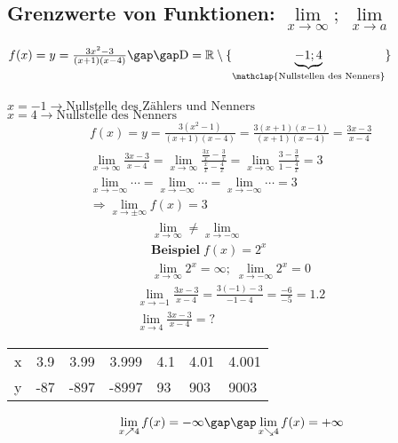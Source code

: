 \subsection{Grenzwerte von Funktionen: $\lim\limits_{x \to \infty};\; \lim\limits_{x \to a}$}
$f(x) = y = \frac{3x^2 - 3}{(x + 1)(x - 4)} \gap\gap \text{D} = \mathbb{R}\setminus\{\underbrace{-1; 4}_{\mathclap{\text{Nullstellen des Nenners}}}\}$ \\\\
$x = -1 \rightarrow \text{Nullstelle des Zählers und Nenners}$ \\
$x = 4 \rightarrow \text{Nullstelle des Nenners}$
\begin{gather*}
  f(x) = y = \frac{3(x^2 - 1)}{(x + 1)(x - 4)} = \frac{3(x + 1)(x - 1)}{(x + 1)(x - 4)} = \frac{3x - 3}{x - 4} \\
  \lim\limits_{x \to \infty} \frac{3x - 3}{x - 4} = \lim\limits_{x \to \infty} \frac{\frac{3x}{x} - \frac{3}{x}}{\frac{x}{x} - \frac{4}{x}} = \lim\limits_{x \to \infty} \frac{3 - \frac{3}{x}}{1 - \frac{4}{x}} = 3 \\
  \lim\limits_{x \to -\infty} \cdots = \lim\limits_{x \to -\infty} \cdots = \lim\limits_{x \to -\infty} \cdots = 3 \\
  \Rightarrow \lim\limits_{x \to \pm\infty} f(x) = 3
\end{gather*}
\begin{gather*}
  \lim\limits_{x \to \infty} \neq \lim\limits_{x \to -\infty} \\
  \textbf{Beispiel}\; f(x) = 2^x \\
  \lim\limits_{x \to \infty} 2^x = \infty;\; \lim\limits_{x \to -\infty} 2^x = 0
\end{gather*}
\begin{gather*}
  \lim\limits_{x \to -1} \frac{3x - 3}{x - 4} = \frac{3(-1) - 3}{-1 - 4} = \frac{-6}{-5} = 1.2 \\
  \lim\limits_{x \to 4} \frac{3x - 3}{x - 4} = \text{?}
\end{gather*}
\begin{tabular}{l|lll|lll}
  x & \multicolumn{1}{c}{3.9} & \multicolumn{1}{c}{3.99} & \multicolumn{1}{c|}{3.999} & \multicolumn{1}{c}{4.1} & 4.01 & 4.001 \\
  y & -87                     & -897                     & -8997                      & 93                      & 903  & 9003
\end{tabular}
\begin{gather*}
  \lim\limits_{ x \nearrow 4} f(x) = -\infty \gap\gap \lim\limits_{ x \searrow 4} f(x) = +\infty
\end{gather*}
